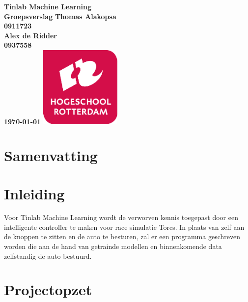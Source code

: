 \documentclass{article}
\begin{document}
\sffamily
\begin{titlepage}
  \centering
    \vfill
    {\bfseries\Huge
      Tinlab Machine Learning \\
      Groepsverslag
        \vskip2cm
      }
      {\bfseries\Large
      	Thomas Alakopsa\\
      	{ \bfseries\normalsize
      	0911723\\
      	}
      }
      {\bfseries\Large
      	Alex de Ridder\\
      	{ \bfseries\normalsize
      	0937558\\
      	}
      }
      {
        \bfseries\normalsize
        \vskip2cm
        \today
    }    
    \vfill
    \includegraphics[width=4cm]{logohr.png}
    \vfill
    \vfill
\end{titlepage}
\newpage

\section{Samenvatting}



\section{Inleiding}
Voor Tinlab Machine Learning wordt de verworven kennis toegepast door een intelligente controller te maken voor race simulatie Torcs. In plaats van zelf aan de knoppen te zitten en de auto te besturen, zal er een programma geschreven worden die aan de hand van getrainde modellen en binnenkomende data zelfstandig de auto bestuurd. 


\section{Projectopzet}


\end{document}
